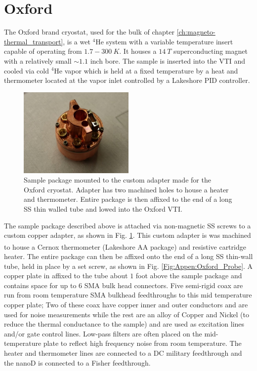 \section{Oxford}
The Oxford brand cryostat, used for the bulk of chapter \ref{ch:magneto-thermal_transport}, is a wet $^4$He system with a variable temperature insert capable of operating from $1.7-300~K$. It houses a $14~T$ superconducting magnet with a relatively small ${\sim}1.1$  inch bore. The sample is inserted into the VTI and cooled via cold $^4$He vapor which is held at a fixed temperature by a heat and thermometer located at the vapor inlet controlled by a Lakeshore PID controller. 

\begin{figure}
\centering
\includegraphics[width = 0.5\textwidth]{figures/appendix/cryostats/Oxford_package.jpg}
\caption{Sample package mounted to the custom adapter made for the Oxford cryostat. Adapter has two machined holes to house a heater and thermometer. Entire package is then affixed to the end of a long SS thin walled tube and lowed into the Oxford VTI.}
\label{Fig:Appen:Oxford_package}
\end{figure}

The sample package described above is attached via non-magnetic SS screws to a custom copper adapter, as shown in Fig. \ref{Fig:Appen:Oxford_package}. This custom adapter is was machined to house a Cernox\textsuperscript{\textregistered} thermometer (Lakeshore AA package) and resistive cartridge heater. The entire package can then be affixed onto the end of a long SS thin-wall tube, held in place by a set screw, as shown in Fig. \ref{Fig:Appen:Oxford_Probe}. A copper plate in affixed to the tube about $1$ foot above the sample package and contains space for up to 6 SMA bulk head connectors. Five semi-rigid coax are run from room temperature SMA bulkhead feedthroughs to this mid temperature copper plate; Two of these coax have copper inner and outer conductors and are used for noise measurements while the rest are an alloy of Copper and Nickel (to reduce the thermal conductance to the sample) and are used as excitation lines and/or gate control lines. Low-pass filters are often placed on the mid-temperature plate to reflect high frequency noise from room temperature. The heater and thermometer lines are connected to a DC military feedthrough and the nanoD is connected to a Fisher feedthrough.

